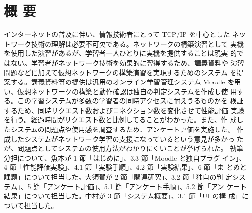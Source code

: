 \section*{\center 概 要}

インターネットの普及に伴い、情報技術者にとって TCP/IP を中心とした ネットワーク技術の理解は必要不可欠である。ネットワークの構築演習として 実機を使用した演習があるが、学習者一人ひとりに実機を提供することは現実 的ではない。学習者がネットワーク技術を効果的に習得するため、講義資料や 演習問題などに加えて仮想ネットワークの構築演習を実現するためのシステム を提案する。講義資料等の提供は汎用のオンライン学習管理システム Moodle を用い、仮想ネットワークの構築と動作確認は独自の判定システムを作成し使 用する。この学習システムが多数の学習者の同時アクセスに耐えうるものかを 検証するため、同時リクエスト数およびコネクション数を変化させて性能評価 実験を行う。経過時間がリクエスト数と比例してることがわかった。また、作 成したシステムの問題点や使用感を調査するため、アンケート評価を実施した。 作成したシステムがネットワーク学習の支援になっているという意見が多かっ たが、問題点としてシステムの使用方法がわかりにくいことが挙げられた。
執筆分担について、魚本が 1 節「はじめに」、3.3 節「Moodle と独自プラグ イン」、4 節「性能評価実験」、4.1 節「実験手順」、4.2 節「実験結果」、6 節「ま とめと課題」について担当した。大須賀が 2 節「関連研究」、3.2 節「独自の判 定システム」、5 節「アンケート評価」、5.1 節「アンケート手順」、5.2 節「アン ケート結果」について担当した。中村が 3 節「システム概要」、3.1 節「UI の構 成」について担当した。
